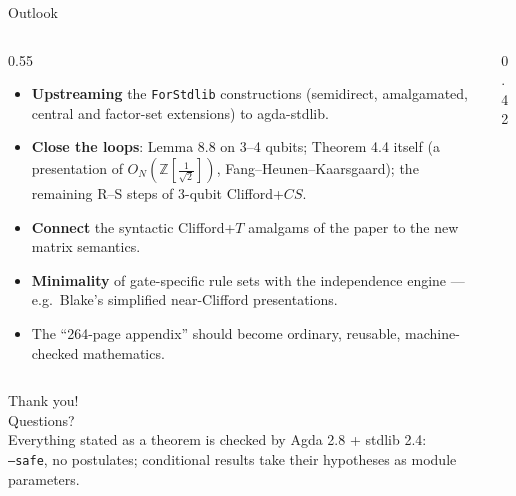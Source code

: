 \begin{frame}{Outlook \Mixed}
\begin{columns}[c]
\begin{column}{0.55\textwidth}
\begin{itemize}
  \setlength{\itemsep}{3pt}
  \item \textbf{Upstreaming} the \texttt{ForStdlib} constructions (semidirect,
        amalgamated, central and factor-set extensions) to agda-stdlib.
  \item \textbf{Close the loops}: Lemma 8.8 on 3--4 qubits; Theorem 4.4 itself
        (a presentation of $O_N(\mathbb{Z}[\frac1{\sqrt2}])$, Fang--Heunen--Kaarsgaard);
        the remaining R--S steps of 3-qubit Clifford+$CS$.
  \item \textbf{Connect} the syntactic Clifford+$T$ amalgams of the paper to the
        new matrix semantics.
  \item \textbf{Minimality} of gate-specific rule sets with the independence
        engine --- e.g.\ Blake's simplified near-Clifford presentations.
  \item The ``264-page appendix'' should become \alert{ordinary, reusable,
        machine-checked mathematics}.
\end{itemize}
\end{column}
\begin{column}{0.42\textwidth}
\centering
{}
\end{column}
\end{columns}
\end{frame}

\begin{frame}[standout]
Thank you!\\[10pt]
{\normalsize Questions?}\\[16pt]
{\footnotesize Everything stated as a theorem is checked by Agda 2.8 + stdlib 2.4:\\
\texttt{--safe}, no postulates; conditional results take their hypotheses as
module parameters.}
\end{frame}
